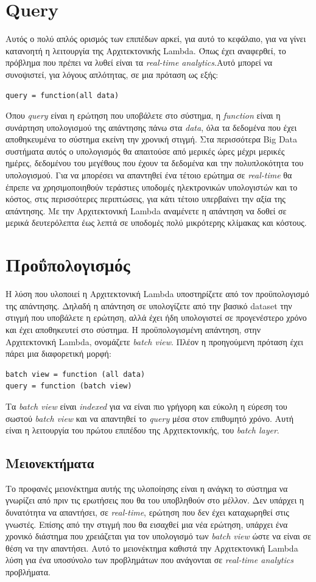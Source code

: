\section{Query}
Αυτός ο πολύ απλός ορισμός των επιπέδων αρκεί, για αυτό το κεφάλαιο, για να γίνει κατανοητή η λειτουργία της Αρχιτεκτονικής Lambda. Όπως έχει αναφερθεί, το πρόβλημα που πρέπει να λυθεί είναι τα \textit{real-time analytics}.Αυτό μπορεί να συνοψιστεί, για λόγους απλότητας, σε μια πρόταση ως εξής:
\begin{verbatim}
query = function(all data)
\end{verbatim}

Όπου \textit{query} είναι η ερώτηση που υποβάλετε στο σύστημα, η \textit{function} είναι η συνάρτηση υπολογισμού της απάντησης πάνω στα \textit{data}, όλα τα δεδομένα που έχει αποθηκευμένα το σύστημα εκείνη την χρονική στιγμή.
\newline
Στα περισσότερα Big Data συστήματα αυτός ο υπολογισμός θα απαιτούσε από μερικές ώρες μέχρι μερικές ημέρες, δεδομένου του μεγέθους που έχουν τα δεδομένα και την πολυπλοκότητα του υπολογισμού. Για να μπορέσει να απαντηθεί ένα τέτοιο ερώτημα σε \textit{real-time} θα έπρεπε να χρησιμοποιηθούν τεράστιες υποδομές ηλεκτρονικών υπολογιστών και το κόστος, στις περισσότερες περιπτώσεις, για κάτι τέτοιο υπερβαίνει την αξία της απάντησης. Με την Αρχιτεκτονική Lambda αναμένετε η απάντηση να δοθεί σε μερικά δευτερόλεπτα έως λεπτά σε υποδομές πολύ μικρότερης κλίμακας και κόστους. 

\section{Προΰπολογισμός}
Η λύση που υλοποιεί η Αρχιτεκτονική Lambda υποστηρίζετε από τον προϋπολογισμό της απάντησης. Δηλαδή η απάντηση σε υπολογίζετε από την βασικό dataset την στιγμή που υποβάλετε η ερώτηση, αλλά έχει ήδη υπολογιστεί σε προγενέστερο χρόνο και έχει αποθηκευτεί στο σύστημα. Η προϋπολογισμένη απάντηση, στην Αρχιτεκτονική Lambda, ονομάζετε \textit{batch view}. Πλέον η προηγούμενη πρόταση έχει πάρει μια διαφορετική μορφή:
\begin{verbatim}
batch view = function (all data)
query = function (batch view)
\end{verbatim}
Τα \textit{batch view} είναι \textit{indexed} για να είναι πιο γρήγορη και εύκολη η εύρεση του σωστού \textit{batch view} και να απαντηθεί το \textit{query} μέσα στον επιθυμητό χρόνο. Αυτή είναι η λειτουργία του πρώτου επιπέδου της Αρχιτεκτονικής, του \textit{batch layer}.

\subsection{Μειονεκτήματα}
Το προφανές μειονέκτημα αυτής της υλοποίησης είναι η ανάγκη το σύστημα να γνωρίζει από πριν τις ερωτήσεις που θα του υποβληθούν στο μέλλον. Δεν υπάρχει η δυνατότητα να απαντήσει, σε \textit{real-time}, ερώτηση που δεν έχει καταχωρηθεί στις γνωστές. Επίσης από την στιγμή που θα εισαχθεί μια νέα ερώτηση, υπάρχει ένα χρονικό διάστημα που χρειάζεται για τον υπολογισμό των \textit{batch view} ώστε να είναι σε θέση να την απαντήσει. Αυτό το μειονέκτημα καθιστά την Αρχιτεκτονική Lambda λύση για ένα υποσύνολο των προβλημάτων που ανάγονται σε \textit{real-time analytics} προβλήματα.